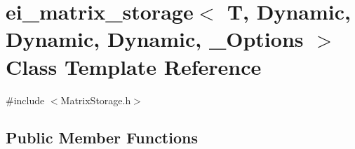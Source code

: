 \hypertarget{classei__matrix__storage_3_01_t_00_01_dynamic_00_01_dynamic_00_01_dynamic_00_01___options_01_4}{\section{ei\-\_\-matrix\-\_\-storage$<$ T, Dynamic, Dynamic, Dynamic, \-\_\-\-Options $>$ Class Template Reference}
\label{classei__matrix__storage_3_01_t_00_01_dynamic_00_01_dynamic_00_01_dynamic_00_01___options_01_4}
}


{\ttfamily \#include $<$Matrix\-Storage.\-h$>$}

\subsection*{Public Member Functions}
